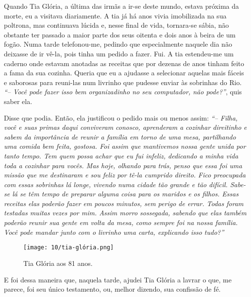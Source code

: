 Quando Tia Glória, a última das irmãs a ir-se deste mundo, estava próxima da morte, eu a visitava diariamente.
A tia já há anos vivia imobilizada na sua poltrona, mas continuava lúcida e, nesse final de vida, tornara-se sábia, não obstante ter passado a maior parte dos seus oitenta e dois anos à beira de um fogão.
Numa tarde telefonou-me, pedindo que especialmente naquele dia não deixasse de ir vê-la, pois tinha um pedido a fazer.
Fui.
A tia estendeu-me um caderno onde estavam anotadas as receitas que por dezenas de anos tinham feito a fama da sua cozinha.
Queria que eu a ajudasse a selecionar aquelas mais fáceis e saborosas para reuni-las num livrinho que pudesse enviar às sobrinhas do Rio.
\textit{``-- Você pode fazer isso bem organizadinho no seu computador, não pode?''}, quis saber ela.

Disse que podia.
Então, ela justificou o pedido mais ou menos assim:
\textit{``-- Filha, você e suas primas daqui conviveram conosco, aprenderam a cozinhar direitinho e sabem da importância de reunir a família em torno de uma mesa, partilhando uma comida bem feita, gostosa.
Foi assim que mantivemos nossa gente unida por tanto tempo.
Tem quem possa achar que eu fui infeliz, dedicando a minha vida toda a cozinhar para vocês.
Mas hoje, olhando para trás, penso que essa foi uma missão que me destinaram e sou feliz por tê-la cumprido direito.
Fico preocupada com essas sobrinhas lá longe, vivendo numa cidade tão grande e tão difícil.
Sabe-se lá se têm tempo de preparar alguma coisa para os maridos e os filhos.
Essas receitas elas poderão fazer em poucos minutos, sem perigo de errar.
Todas foram testadas muitas vezes por mim.
Assim morro sossegada, sabendo que elas também poderão reunir sua gente em volta da mesa, como sempre foi na nossa família.
Você pode mandar junto com o livrinho uma carta, explicando isso tudo?''}

\begin{figure}[H]
\centering
\texttt{[image: 10/tia-glória.png]}
\caption{Tia Glória aos 81 anos.}
\end{figure}

E foi dessa maneira que, naquela tarde, ajudei Tia Glória a lavrar o que, me parece, foi seu único testamento, ou, melhor dizendo, sua confissão de fé.
 
